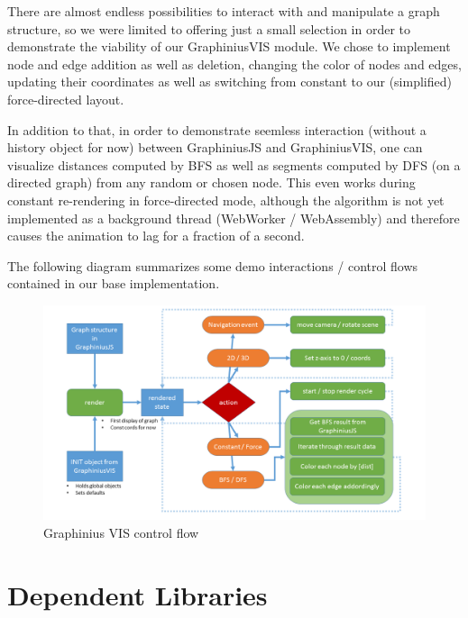 	There are almost endless possibilities to interact with and manipulate a graph structure, so we were limited to offering just a small selection in order to demonstrate the viability of our GraphiniusVIS module. We chose to implement node and edge addition as well as deletion, changing the color of nodes and edges, updating their coordinates as well as switching from constant to our (simplified) force-directed layout. 
	
	In addition to that, in order to demonstrate seemless interaction (without a history object for now) between GraphiniusJS and GraphiniusVIS, one can visualize distances computed by BFS as well as segments computed by DFS (on a directed graph) from any random or chosen node. This even works during constant re-rendering in force-directed mode, although the algorithm is not yet implemented as a background thread (WebWorker / WebAssembly) and therefore causes the animation to lag for a fraction of a second.
	
	The following diagram summarizes some demo interactions / control flows contained in our base implementation.
	
		\begin{figure}[H]
			\centering
			\vspace{1.3cm}
			\hspace*{-0.8cm}
			\includegraphics[angle=0,width=1.1\textwidth]{figures/VIS_Control_Flow}
			\caption{Graphinius VIS control flow}
			\label{fig_vis_control_flow}
		\end{figure}

\newpage

\section{Dependent Libraries}
\label{sect:dep_libraries}

